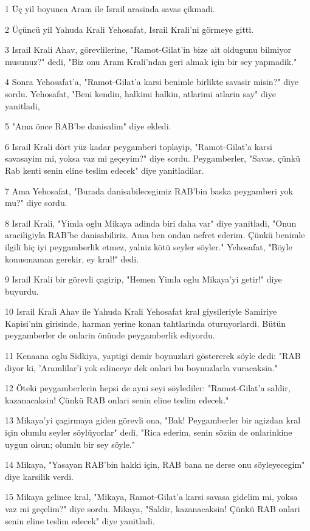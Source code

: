 \par 1 Üç yil boyunca Aram ile Israil arasinda savas çikmadi.
\par 2 Üçüncü yil Yahuda Krali Yehosafat, Israil Krali'ni görmeye gitti.
\par 3 Israil Krali Ahav, görevlilerine, "Ramot-Gilat'in bize ait oldugunu bilmiyor musunuz?" dedi, "Biz onu Aram Krali'ndan geri almak için bir sey yapmadik."
\par 4 Sonra Yehosafat'a, "Ramot-Gilat'a karsi benimle birlikte savasir misin?" diye sordu. Yehosafat, "Beni kendin, halkimi halkin, atlarimi atlarin say" diye yanitladi,
\par 5 "Ama önce RAB'be danisalim" diye ekledi.
\par 6 Israil Krali dört yüz kadar peygamberi toplayip, "Ramot-Gilat'a karsi savasayim mi, yoksa vaz mi geçeyim?" diye sordu. Peygamberler, "Savas, çünkü Rab kenti senin eline teslim edecek" diye yanitladilar.
\par 7 Ama Yehosafat, "Burada danisabilecegimiz RAB'bin baska peygamberi yok mu?" diye sordu.
\par 8 Israil Krali, "Yimla oglu Mikaya adinda biri daha var" diye yanitladi, "Onun araciligiyla RAB'be danisabiliriz. Ama ben ondan nefret ederim. Çünkü benimle ilgili hiç iyi peygamberlik etmez, yalniz kötü seyler söyler." Yehosafat, "Böyle konusmaman gerekir, ey kral!" dedi.
\par 9 Israil Krali bir görevli çagirip, "Hemen Yimla oglu Mikaya'yi getir!" diye buyurdu.
\par 10 Israil Krali Ahav ile Yahuda Krali Yehosafat kral giysileriyle Samiriye Kapisi'nin girisinde, harman yerine konan tahtlarinda oturuyorlardi. Bütün peygamberler de onlarin önünde peygamberlik ediyordu.
\par 11 Kenaana oglu Sidkiya, yaptigi demir boynuzlari göstererek söyle dedi: "RAB diyor ki, 'Aramlilar'i yok edinceye dek onlari bu boynuzlarla vuracaksin."
\par 12 Öteki peygamberlerin hepsi de ayni seyi söylediler: "Ramot-Gilat'a saldir, kazanacaksin! Çünkü RAB onlari senin eline teslim edecek."
\par 13 Mikaya'yi çagirmaya giden görevli ona, "Bak! Peygamberler bir agizdan kral için olumlu seyler söylüyorlar" dedi, "Rica ederim, senin sözün de onlarinkine uygun olsun; olumlu bir sey söyle."
\par 14 Mikaya, "Yasayan RAB'bin hakki için, RAB bana ne derse onu söyleyecegim" diye karsilik verdi.
\par 15 Mikaya gelince kral, "Mikaya, Ramot-Gilat'a karsi savasa gidelim mi, yoksa vaz mi geçelim?" diye sordu. Mikaya, "Saldir, kazanacaksin! Çünkü RAB onlari senin eline teslim edecek" diye yanitladi.
